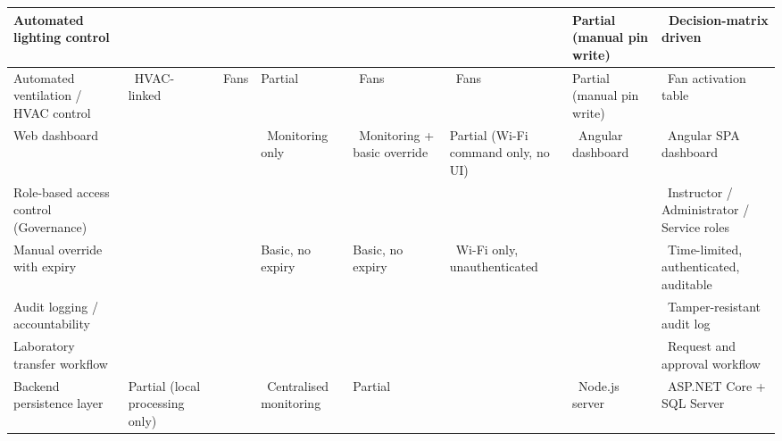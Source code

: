 {\begin{longtable}{|L{2.0cm}|L{1.5cm}|L{1.6cm}|L{1.6cm}|L{1.5cm}|L{1.5cm}|L{1.4cm}|L{1.7cm}|}
			\hline
			Automated lighting control             &                        & \checkmark                              & \checkmark                         & \checkmark                              & \checkmark                              & Partial (manual pin write)          & \checkmark\ Decision-matrix driven                     \\
			\hline
			Automated ventilation / HVAC control   & \checkmark\ HVAC-linked         & \checkmark\ Fans                        & Partial                            & \checkmark\ Fans                        & \checkmark\ Fans                        & Partial (manual pin write)          & \checkmark\ Fan activation table                       \\
			\hline
			Web dashboard                          &                        &                                & \checkmark\ Monitoring only        & \checkmark\ Monitoring + basic override & Partial (Wi-Fi command only, no UI)     & \checkmark\ Angular dashboard       & \checkmark\ Angular SPA dashboard                      \\
			\hline
			Role-based access control (Governance) &                        &                                &                           &                                &                                &                            & \checkmark\ Instructor / Administrator / Service roles \\
			\hline
			Manual override with expiry            &                        &                                & Basic, no expiry                   & Basic, no expiry                        & \checkmark\ Wi-Fi only, unauthenticated &                            & \checkmark\ Time-limited, authenticated, auditable     \\
			\hline
			Audit logging / accountability         &                        &                                &                           &                                &                                &                            & \checkmark\ Tamper-resistant audit log                 \\
			\hline
			Laboratory transfer workflow           &                        &                                &                           &                                &                                &                            & \checkmark\ Request and approval workflow              \\
			\hline
			Backend persistence layer              & Partial (local processing only) &                                & \checkmark\ Centralised monitoring & Partial                                 &                                & \checkmark\ Node.js server          & \checkmark\ ASP.NET Core + SQL Server                  \\
			\hline
		\end{longtable}
	}

